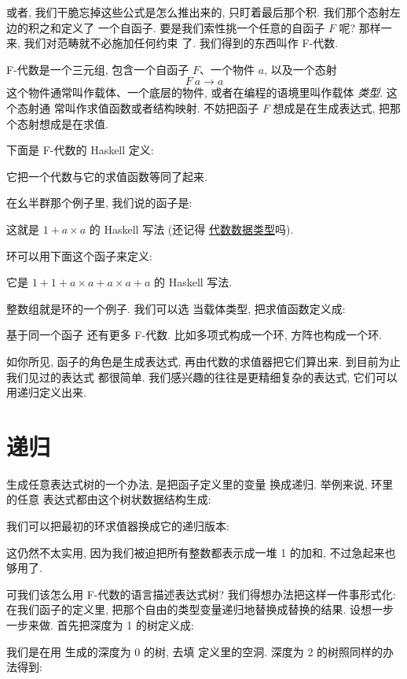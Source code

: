 或者, 我们干脆忘掉这些公式是怎么推出来的, 只盯着最后那个积. 我们那个态射左边的积之和定义了
一个自函子. 要是我们索性挑一个任意的自函子 $F$ 呢? 那样一来, 我们对范畴就不必施加任何约束
了. 我们得到的东西叫作 F-代数.

F-代数是一个三元组, 包含一个自函子 $F$、一个物件 $a$, 以及一个态射
\[F\ a \to a\]
这个物件通常叫作载体、一个底层的物件, 或者在编程的语境里叫作载体 \emph{类型}. 这个态射通
常叫作求值函数或者结构映射. 不妨把函子 $F$ 想成是在生成表达式, 把那个态射想成是在求值.

下面是 F-代数的 Haskell 定义:

它把一个代数与它的求值函数等同了起来.

在幺半群那个例子里, 我们说的函子是:

这就是 $1 + a\times{}a$ 的 Haskell 写法 (还记得
\hyperref[simple-algebraic-data-types]{代数数据类型}吗).

环可以用下面这个函子来定义:

它是 $1 + 1 + a\times{}a + a\times{}a + a$ 的 Haskell 写法.

整数组就是环的一个例子. 我们可以选  当载体类型, 把求值函数定义成:

基于同一个函子  还有更多 F-代数. 比如多项式构成一个环, 方阵也构成一个环.

如你所见, 函子的角色是生成表达式, 再由代数的求值器把它们算出来. 到目前为止我们见过的表达式
都很简单. 我们感兴趣的往往是更精细复杂的表达式, 它们可以用递归定义出来.

\section{递归}

生成任意表达式树的一个办法, 是把函子定义里的变量  换成递归. 举例来说, 环里的任意
表达式都由这个树状数据结构生成:

我们可以把最初的环求值器换成它的递归版本:

这仍然不太实用, 因为我们被迫把所有整数都表示成一堆 1 的加和, 不过急起来也够用了.

可我们该怎么用 F-代数的语言描述表达式树? 我们得想办法把这样一件事形式化: 在我们函子的定义里,
把那个自由的类型变量递归地替换成替换的结果. 设想一步一步来做. 首先把深度为 1 的树定义成:

我们是在用  生成的深度为 0 的树, 去填  定义里的空洞. 深度为 2
的树照同样的办法得到:

